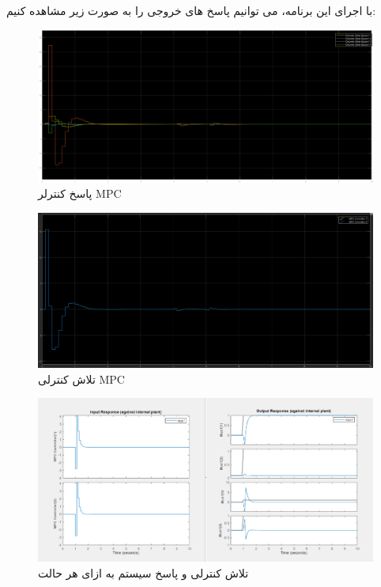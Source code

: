  با اجرای این برنامه، می توانیم پاسخ های خروجی را به صورت زیر مشاهده کنیم:
 
 
 
\begin{figure}[H]
	\centering
	\includegraphics[width=1\linewidth]{../img/Q3_MPC_Output}
	\caption{پاسخ کنترلر MPC}
	\label{fig:q3mpcoutput}
\end{figure}
 
\begin{figure}[H]
	\centering
	\includegraphics[width=1\linewidth]{../img/Q3_MPC_control_effort}
	\caption{تلاش کنترلی MPC}
	\label{fig:q3mpccontroleffort}
\end{figure}
 
 
 \begin{figure}[H]
 	\centering
 	\includegraphics[width=1\linewidth]{../img/Q3_MPC_Setting}
 	\caption{تلاش کنترلی و پاسخ سیستم به ازای هر حالت}
 	\label{fig:q3mpcsetting}
 \end{figure}
 
